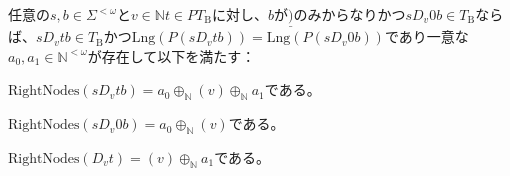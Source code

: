 \documentclass[dvipdfmx,uplatex]{jsarticle}
\theoremstyle{customnonumberbreakfortheorem}
\theoremstyle{customnonumberbreakforproof}
\begin{document}
\begin{proposition}\label{RightNodesと部分表現の関係}
	任意の\(s,b \in \Sigma^{< \omega}\)と\(v \in \mathbb{N}\)\(t \in PT_{\textrm{B}}\)に対し、\(b\)が\(\underline{)}\)のみからなりかつ\(s D_v 0 b \in T_{\textrm{B}}\)ならば、\(s D_v t b \in T_{\textrm{B}}\)かつ\(\textrm{Lng}(P(s D_v t b)) = \textrm{Lng}(P(s D_v 0 b))\)であり一意な\(a_0, a_1 \in \mathbb{N}^{< \omega}\)が存在して以下を満たす：
	\begin{penumerate}
		\item \(\textrm{RightNodes}(s D_v t b) = a_0 \oplus_{\mathbb{N}} (v) \oplus_{\mathbb{N}} a_1\)である。
		\item \(\textrm{RightNodes}(s D_v 0 b) = a_0 \oplus_{\mathbb{N}} (v)\)である。
		\item \(\textrm{RightNodes}(D_v t) = (v) \oplus_{\mathbb{N}} a_1\)である。
	\end{penumerate}
\end{proposition}
\end{document}
